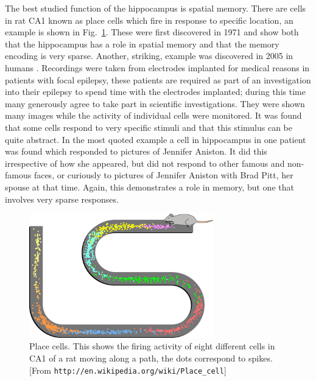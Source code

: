 \documentclass[11pt,a4paper]{scrartcl}
\begin{document}
The best studied function of the hippocampus is spatial memory. There
are cells in rat CA1 known as place cells which fire in response to
specific location, an example is shown in Fig.~\ref{fig:place}. These
were first discovered in 1971 \cite{OKeefeDostrovsky1971a} and show
both that the hippocampus has a role in spatial memory and that the
memory encoding is very sparse. Another, striking, example was
discovered in 2005 in humans \cite{QuianQuirogalEtAl2005a}. Recordings
were taken from electrodes implanted for medical reasons in patients
with focal epilepsy, these patients are required as part of an
investigation into their epilepsy to spend time with the electrodes
implanted; during this time many generously agree to take part in
scientific investigations. They were shown many images while the
activity of individual cells were monitored. It was found that some
cells respond to very specific stimuli and that this stimulus can be
quite abstract. In the most quoted example a cell in hippocampus in
one patient was found which responded to pictures of Jennifer
Aniston. It did this irrespective of how she appeared, but did not
respond to other famous and non-famous faces, or curiously to pictures
of Jennifer Aniston with Brad Pitt, her spouse at that time. Again,
this demonstrates a role in memory, but one that involves very sparse
responses.

\begin{figure}
\begin{center}
\includegraphics[width=8cm]{Place_Cell_Spiking_Activity_Example.png}
\end{center}
\caption{Place cells. This shows the firing activity of eight different cells in CA1 of a rat moving along a path, the dots correspond to spikes. [From \texttt{http://en.wikipedia.org/wiki/Place\_cell}]\label{fig:place}}
\end{figure}
\end{document}
